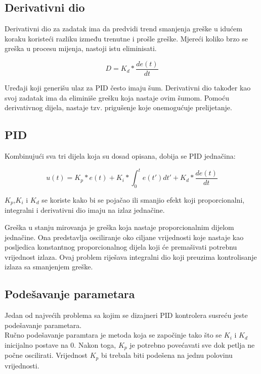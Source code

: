 \documentclass[../Document.tex]{subfiles}
\begin{document}
\subsection{Derivativni dio}
Derivativni dio za zadatak ima da predvidi trend smanjenja greške u idućem koraku koristeći razliku između trenutne i prošle greške. Mjereći koliko brzo se greška u procesu mijenja, nastoji istu eliminisati.

$$
    D=K_d*\frac{de(t)}{dt}
$$

\noindent Uređaji koji generišu ulaz za PID često imaju šum. Derivativni dio također kao svoj zadatak ima da eliminiše grešku koja nastaje ovim šumom. Pomoću derivativnog dijela, nastaje tzv. prigušenje koje onemogućuje prelijetanje.
\clearpage

\subsection{PID}
Kombinujući sva tri dijela koja su dosad opisana, dobija se PID jednačina:

$$
    u(t)=K_p*e(t) + K_i*\int_{0}^{t}e(t')dt' + K_d*\frac{de(t)}{dt}
$$

\noindent $K_p$,$K_i$ i $K_d$ se koriste kako bi se pojačao ili smanjio efekt koji proporcionalni, integralni i derivativni dio imaju na izlaz jednačine.\\


\noindent Greška u stanju mirovanja je greška koja nastaje proporcionalnim dijelom jednačine. Ona predstavlja osciliranje oko ciljane vrijednosti koje nastaje kao posljedica konstantnog proporcionalnog dijela koji će premašivati potrebnu vrijednost izlaza. Ovaj problem riješava integralni dio koji preuzima kontrolisanje izlaza sa smanjenjem greške.


\subsection{Podešavanje parametara} \label{tuning}
Jedan od najvećih problema sa kojim se dizajneri PID kontrolera susreću jeste podešavanje parametara.\\

\noindent Ručno podešavanje paramtara je metoda koja se započinje tako što se $K_i$ i $K_d$ inicijalno postave na 0. Nakon toga, $K_p$ je potrebno povećavati sve dok petlja ne počne oscilirati. Vrijednost $K_p$ bi trebala biti podešena na jednu polovinu vrijednosti.
\end{document}
